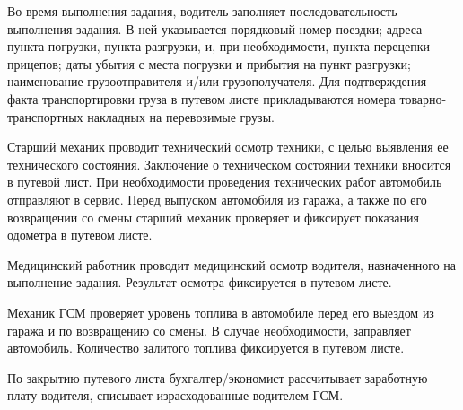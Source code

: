 \documentclass[../nirs.tex]{subfiles}
\begin{document}
Во время выполнения задания, водитель заполняет последовательность выполнения
задания. В ней указывается порядковый номер поездки; адреса пункта погрузки,
пункта разгрузки, и, при необходимости, пункта перецепки прицепов; даты убытия с
места погрузки и прибытия на пункт разгрузки; наименование грузоотправителя
и/или грузополучателя. Для подтверждения факта транспортировки груза в путевом
листе прикладываются номера товарно-транспортных накладных на перевозимые грузы.

Старший механик проводит технический осмотр техники, с целью выявления ее
технического состояния. Заключение о техническом состоянии техники
вносится в путевой лист. При необходимости проведения технических работ
автомобиль отправляют в сервис. Перед выпуском автомобиля из гаража, а также по
его возвращении со смены старший механик проверяет и фиксирует показания
одометра в путевом листе.

Медицинский работник проводит медицинский осмотр водителя, назначенного на
выполнение задания. Результат осмотра фиксируется в путевом листе.

Механик ГСМ проверяет уровень топлива в автомобиле перед его выездом из гаража и
по возвращению со смены. В случае необходимости, заправляет автомобиль.
Количество залитого топлива фиксируется в путевом листе.

По закрытию путевого листа бухгалтер/экономист рассчитывает заработную плату
водителя, списывает израсходованные водителем ГСМ.
\end{document}
